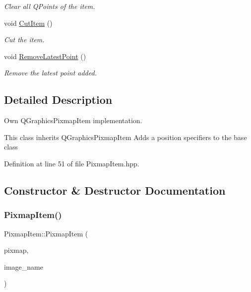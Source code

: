 \begin{DoxyCompactItemize}
\begin{DoxyCompactList}\small\item\em Clear all Q\+Points of the item. \end{DoxyCompactList}\item 
void \mbox{\hyperlink{classPixmapItem_a4a742318dce01d018da2f4b01790c210}{Cut\+Item}} ()
\begin{DoxyCompactList}\small\item\em Cut the item. \end{DoxyCompactList}\item 
void \mbox{\hyperlink{classPixmapItem_ae2e67a7b69ef10dc613e14c1d3c1a327}{Remove\+Latest\+Point}} ()
\begin{DoxyCompactList}\small\item\em Remove the latest point added. \end{DoxyCompactList}\end{DoxyCompactItemize}


\subsection{Detailed Description}
Own Q\+Graphics\+Pixmap\+Item implementation. 

This class inherits Q\+Graphics\+Pixmap\+Item Adds a position specifiers to the base class 

Definition at line 51 of file Pixmap\+Item.\+hpp.



\subsection{Constructor \& Destructor Documentation}
\mbox{\label{classPixmapItem_a7e339e581be3c4892d2af89494bd137c}} 
\subsubsection{\texorpdfstring{Pixmap\+Item()}{PixmapItem()}}
{\footnotesize\ttfamily Pixmap\+Item\+::\+Pixmap\+Item (\begin{DoxyParamCaption}\item[{Q\+Pixmap}]{pixmap,  }\item[{Q\+String}]{image\+\_\+name }\end{DoxyParamCaption})}



